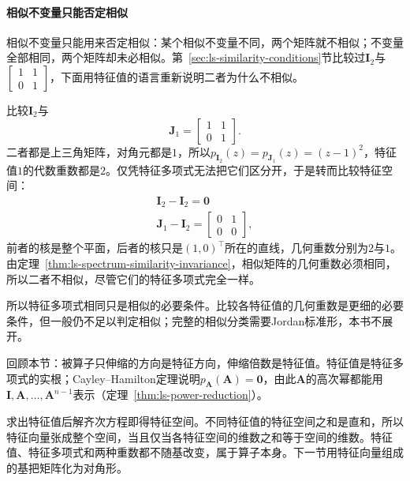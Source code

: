 \paragraph{相似不变量只能否定相似}
相似不变量只能用来否定相似：某个相似不变量不同，两个矩阵就不相似；不变量全部相同，两个矩阵却未必相似。第~\ref{sec:ls-similarity-conditions}节比较过$\bm I_2$与$\left[\begin{smallmatrix}1&1\\0&1\end{smallmatrix}\right]$，下面用特征值的语言重新说明二者为什么不相似。
\begin{example}[反例：特征多项式相同而不相似]
\label{ex:ls-same-charpoly-not-similar}
比较$\bm I_2$与
\[
 \bm J_1=\begin{bmatrix}1&1\\0&1\end{bmatrix}.
\]
二者都是上三角矩阵，对角元都是$1$，所以$p_{\bm I_2}(z)=p_{\bm J_1}(z)=(z-1)^2$，特征值$1$的代数重数都是$2$。仅凭特征多项式无法把它们区分开，于是转而比较特征空间：
\[
\begin{gathered}
\bm I_2-\bm I_2=\bm0\\
\bm J_1-\bm I_2=\begin{bmatrix}0&1\\0&0\end{bmatrix},
\end{gathered}
\]
前者的核是整个平面，后者的核只是$(1,0)^{\top}$所在的直线，几何重数分别为$2$与$1$。由定理~\ref{thm:ls-spectrum-similarity-invariance}，相似矩阵的几何重数必须相同，所以二者不相似，尽管它们的特征多项式完全一样。
\end{example}
所以特征多项式相同只是相似的必要条件。比较各特征值的几何重数是更细的必要条件，但一般仍不足以判定相似；完整的相似分类需要Jordan标准形，本书不展开。

回顾本节：被算子只伸缩的方向是特征方向，伸缩倍数是特征值。特征值是特征多项式的实根；Cayley--Hamilton定理说明$p_{\bm A}(\bm A)=\bm0$，由此$\bm A$的高次幂都能用$\bm I,\bm A,\ldots,\bm A^{n-1}$表示（定理~\ref{thm:ls-power-reduction}）。

求出特征值后解齐次方程即得特征空间。不同特征值的特征空间之和是直和，所以特征向量张成整个空间，当且仅当各特征空间的维数之和等于空间的维数。特征值、特征多项式和两种重数都不随基改变，属于算子本身。下一节用特征向量组成的基把矩阵化为对角形。
